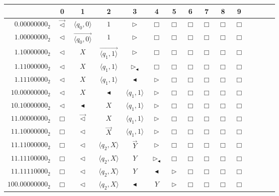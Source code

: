 \documentclass[pre,amssymb,showpacs,showkeys,preprint]{revtex4}
\begin{document}
\begin{figure}
\begin{center}
\scriptsize     {
\renewcommand{\arraystretch}{0.9}
\begin{tabular}{r|cccccccccccccc}
   &0 &1 & 2 & 3 & 4 & 5 & 6 & 7 & 8 & 9 \\ \hline
$0.00000000_2$ & $\overrightarrow{\lhd}$ & $\langle q_0,0 \rangle$ & $1$ & $\rhd$ & $\Box$ & $\Box$ & $\Box$ & $\Box$ & $\Box$ & $\Box$ \\
$1.00000000_2$ & $\lhd$ & $\overrightarrow{\langle q_0,0 \rangle}$ & $1$ & $\rhd$ & $\Box$ & $\Box$ & $\Box$ & $\Box$ & $\Box$ & $\Box$ \\
$1.10000000_2$ & $\lhd$ & $X$ & $\overrightarrow{\langle q_1,1 \rangle}$ & $\rhd$ & $\Box$ & $\Box$ & $\Box$ & $\Box$ & $\Box$ & $\Box$ \\
$1.11000000_2$ & $\lhd$ & $X$ & $\langle q_1,1 \rangle$ & $\rhd_\blacktriangleleft$ & $\Box$ & $\Box$ & $\Box$ & $\Box$ & $\Box$ & $\Box$ \\
$1.11100000_2$ & $\lhd$ & $X$ & $\langle q_1,1 \rangle$ & $\blacktriangleleft$ & $\rhd$ & $\Box$ & $\Box$ & $\Box$ & $\Box$ & $\Box$ \\
$10.00000000_2$ & $\lhd$ & $X$ & $\blacktriangleleft$ & $\langle q_1,1 \rangle$ & $\rhd$ & $\Box$ & $\Box$ & $\Box$ & $\Box$ & $\Box$ \\
$10.10000000_2$ & $\lhd$ & $\blacktriangleleft$ & $X$ & $\langle q_1,1 \rangle$ & $\rhd$ & $\Box$ & $\Box$ & $\Box$ & $\Box$ & $\Box$ \\
$11.00000000_2$ & $\Box$ & $\overrightarrow{\lhd}$ & $X$ & $\langle q_1,1 \rangle$ & $\rhd$ & $\Box$ & $\Box$ & $\Box$ & $\Box$ & $\Box$ \\
$11.10000000_2$ & $\Box$ & $\lhd$ & $\overrightarrow{X}$ & $\langle q_1,1 \rangle$ & $\rhd$ & $\Box$ & $\Box$ & $\Box$ & $\Box$ & $\Box$ \\
$11.11000000_2$ & $\Box$ & $\lhd$ & $\langle q_2,X \rangle$ & $\overrightarrow{Y}$ & $\rhd$ & $\Box$ & $\Box$ & $\Box$ & $\Box$ & $\Box$ \\
$11.11100000_2$ & $\Box$ & $\lhd$ & $\langle q_2,X \rangle$ & $Y$ & $\rhd_\blacktriangleleft$ & $\Box$ & $\Box$ & $\Box$ & $\Box$ & $\Box$ \\
$11.11110000_2$ & $\Box$ & $\lhd$ & $\langle q_2,X \rangle$ & $Y$ & $\blacktriangleleft$ & $\rhd$ & $\Box$ & $\Box$ & $\Box$ & $\Box$ \\
$100.00000000_2$ & $\Box$ & $\lhd$ & $\langle q_2,X \rangle$ & $\blacktriangleleft$ & $Y$ & $\rhd$ & $\Box$ & $\Box$ & $\Box$ & $\Box$ \\

\end{tabular}}
\end{center}
\end{figure}
\end{document}
